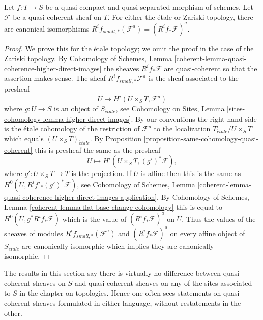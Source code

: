 \begin{lemma}
\label{lemma-higher-direct-images-small-etale}
Let $f : T \to S$ be a quasi-compact and quasi-separated morphism of schemes.
Let $\mathcal{F}$ be a quasi-coherent sheaf on $T$. For either the \'etale
or Zariski topology, there are canonical isomorphisms
$R^if_{small, *}(\mathcal{F}^a) = (R^if_*\mathcal{F})^a$.
\end{lemma}

\begin{proof}
We prove this for the \'etale topology; we omit the proof in the case
of the Zariski topology. By Cohomology of Schemes, Lemma
\ref{coherent-lemma-quasi-coherence-higher-direct-images}
the sheaves $R^if_*\mathcal{F}$ are quasi-coherent so that the assertion
makes sense. The sheaf $R^if_{small, *}\mathcal{F}^a$ is the sheaf associated
to the presheaf
$$
U \longmapsto H^i(U \times_S T, \mathcal{F}^a)
$$
where $g : U \to S$ is an object of $S_{\acute{e}tale}$, see
Cohomology on Sites, Lemma \ref{sites-cohomology-lemma-higher-direct-images}.
By our conventions the right hand side is the \'etale
cohomology of the restriction of $\mathcal{F}^a$ to the localization
$T_{\acute{e}tale}/U \times_S T$ which equals
$(U \times_S T)_{\acute{e}tale}$. By
Proposition \ref{proposition-same-cohomology-quasi-coherent}
this is presheaf the same as the presheaf
$$
U \longmapsto
H^i(U \times_S T, (g')^*\mathcal{F}),
$$
where $g' : U \times_S T \to T$ is the projection. If $U$ is affine
then this is the same as $H^0(U, R^if'_*(g')^*\mathcal{F})$, see
Cohomology of Schemes, Lemma
\ref{coherent-lemma-quasi-coherence-higher-direct-images-application}.
By
Cohomology of Schemes, Lemma \ref{coherent-lemma-flat-base-change-cohomology}
this is equal to $H^0(U, g^*R^if_*\mathcal{F})$ which is the value
of $(R^if_*\mathcal{F})^a$ on $U$.
Thus the values of the sheaves of modules
$R^if_{small, *}(\mathcal{F}^a)$ and $(R^if_*\mathcal{F})^a$
on every affine object of $S_{\acute{e}tale}$ are canonically isomorphic
which implies they are canonically isomorphic.
\end{proof}

\noindent
The results in this section say there is virtually no difference between
quasi-coherent sheaves on $S$ and quasi-coherent sheaves on any of the
sites associated to $S$ in the chapter on topologies. Hence one often
sees statements on quasi-coherent sheaves formulated in either language,
without restatements in the other.







